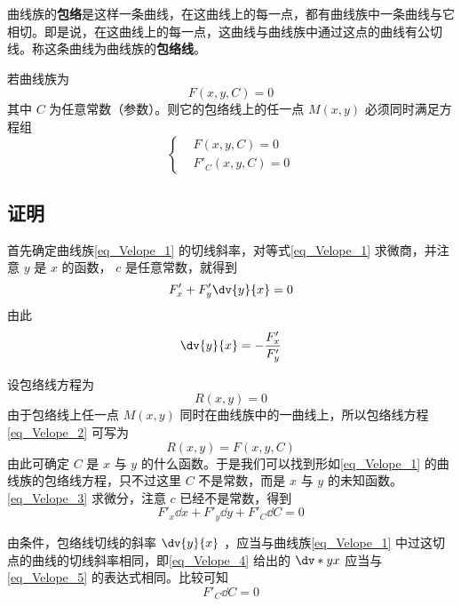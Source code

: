 曲线族的\textbf{包络}是这样一条曲线，在这曲线上的每一点，都有曲线族中一条曲线与它相切。即是说，在这曲线上的每一点，这曲线与曲线族中通过这点的曲线有公切线。称这条曲线为曲线族的\textbf{包络线}。

若曲线族为 
\begin{equation}\label{eq_Velope_1}
F(x,y,C)=0
\end{equation}
其中 $C$ 为任意常数（参数）。则它的包络线上的任一点 $M(x,y)$ 必须同时满足方程组
\begin{equation}\label{eq_Velope_6}
\left\{\begin{aligned}
&F(x,y,C)=0\\
&F'_C(x,y,C)=0
\end{aligned}\right.
\end{equation}
\subsection{证明}
首先确定曲线族\autoref{eq_Velope_1} 的切线斜率，对等式\autoref{eq_Velope_1} 求微商，并注意 $y$ 是 $x$ 的函数， $c$ 是任意常数，就得到
\begin{equation}
F'_x+F'_y\dv{y}{x}=0
\end{equation}
由此
\begin{equation}\label{eq_Velope_5}
\dv{y}{x}=-\frac{F'_x}{F'_y}
\end{equation}

设包络线方程为
\begin{equation}\label{eq_Velope_2}
R(x,y)=0
\end{equation}
由于包络线上任一点 $M(x,y)$ 同时在曲线族中的一曲线上，所以包络线方程\autoref{eq_Velope_2} 可写为
\begin{equation}\label{eq_Velope_3}
R(x,y)=F(x,y,C)
\end{equation}
由此可确定 $C$ 是 $x$ 与 $y$ 的什么函数。于是我们可以找到形如\autoref{eq_Velope_1} 的曲线族的包络线方程，只不过这里 $C$ 不是常数，而是 $x$ 与 $y$ 的未知函数。\autoref{eq_Velope_3} 求微分，注意 $c$ 已经不是常数，得到
\begin{equation}\label{eq_Velope_4}
F'_x\dd x+F'_y\dd y+F'_C\dd C=0
\end{equation}

由条件，包络线切线的斜率 $\dv{y}{x}$ ，应当与曲线族\autoref{eq_Velope_1} 中过这切点的曲线的切线斜率相同，即\autoref{eq_Velope_4} 给出的 $\dv*{y}{x}$ 应当与\autoref{eq_Velope_5} 的表达式相同。比较可知
\begin{equation}
F'_C\dd C=0
\end{equation}

